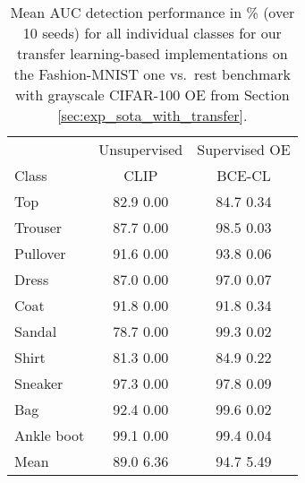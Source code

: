 \documentclass[10pt]{article} \usepackage[accepted]{stylefiles/tmlr}
\begin{document}
\begin{table*}[th]
    \caption{Mean AUC detection performance in \% (over 10 seeds) for all individual classes for our transfer learning-based implementations on the Fashion-MNIST one vs.~rest benchmark with grayscale CIFAR-100 OE from Section \ref{sec:exp_sota_with_transfer}. }
    \label{tab:fmnist_one_vs_rest_transfer}
    \vspace{0.5em}
    \centering\small
    
\begin{tabular}{lcc}
\toprule
& \multicolumn{1}{c|}{Unsupervised} &   \multicolumn{1}{c}{Supervised OE} \\
Class &   \multicolumn{1}{c|}{CLIP} &     \multicolumn{1}{c}{BCE-CL} \\
\midrule
Top & \multicolumn{1}{c|}{82.9  0.00} & \multicolumn{1}{c}{84.7  0.34} \\
Trouser & \multicolumn{1}{c|}{87.7  0.00} & \multicolumn{1}{c}{98.5  0.03} \\
Pullover & \multicolumn{1}{c|}{91.6  0.00} & \multicolumn{1}{c}{93.8  0.06} \\
Dress & \multicolumn{1}{c|}{87.0  0.00} & \multicolumn{1}{c}{97.0  0.07} \\
Coat & \multicolumn{1}{c|}{91.8  0.00} & \multicolumn{1}{c}{91.8  0.34} \\
Sandal & \multicolumn{1}{c|}{78.7  0.00} & \multicolumn{1}{c}{99.3  0.02} \\
Shirt & \multicolumn{1}{c|}{81.3  0.00} & \multicolumn{1}{c}{84.9  0.22} \\
Sneaker & \multicolumn{1}{c|}{97.3  0.00} & \multicolumn{1}{c}{97.8  0.09} \\
Bag & \multicolumn{1}{c|}{92.4  0.00} & \multicolumn{1}{c}{99.6  0.02} \\
Ankle boot & \multicolumn{1}{c|}{99.1  0.00} & \multicolumn{1}{c}{99.4  0.04} \\
\midrule
Mean & \multicolumn{1}{c|}{89.0  6.36} & \multicolumn{1}{c}{94.7  5.49} \\
\bottomrule
\end{tabular}
     \end{table*}
\end{document}
